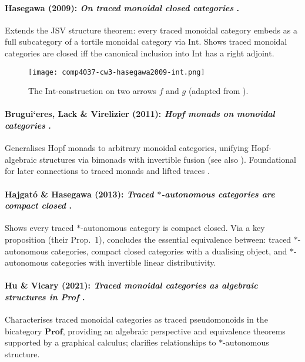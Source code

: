 \paragraph{Hasegawa (2009): \emph{On traced monoidal closed categories} \cite{hasegawa2009-traced-monoidal-closed}.}
Extends the JSV structure theorem: every traced monoidal category embeds as a full subcategory of a tortile monoidal category via $\mathrm{Int}$. Shows traced monoidal categories are closed iff the canonical inclusion into $\mathrm{Int}$ has a right adjoint.
\begin{figure}[ht]
	\centering
	\texttt{[image: comp4037-cw3-hasegawa2009-int.png]}
	\caption{The $\mathrm{Int}$-construction on two arrows $f$ and $g$ (adapted from \cite[Sec.\ 3.3]{hasegawa2009-traced-monoidal-closed}).}
	\label{fig:hasegawa-int}
\end{figure}
\paragraph{Brugui`eres, Lack \& Virelizier (2011): \emph{Hopf monads on monoidal categories} \cite{bruguieres2011-hopf-monads-monoidal}.}
Generalises Hopf monads to arbitrary monoidal categories, unifying Hopf-algebraic structures via bimonads with invertible fusion (see also \cite{day2004-quantum-categories-star,bohm2018-hopf-algebras-generalizations}). Foundational for later connections to traced monads and lifted traces \cite{shimizu2019-non-degeneracy-conditions-braided}.
\paragraph{Hajgat\'o \& Hasegawa (2013): \emph{Traced $*$-autonomous categories are compact closed} \cite{hajgato2013-traced-autonomous-categories}.}
Shows every traced $*$-autonomous category is compact closed. Via a key proposition (their Prop.\ 1), concludes the essential equivalence between: traced $*$-autonomous categories, compact closed categories with a dualising object, and $*$-autonomous categories with invertible linear distributivity.
\paragraph{Hu \& Vicary (2021): \emph{Traced monoidal categories as algebraic structures in Prof} \cite{hu2021-traced-monoidal-categories}.}
Characterises traced monoidal categories as traced pseudomonoids in the bicategory $\mathbf{Prof}$, providing an algebraic perspective and equivalence theorems supported by a graphical calculus; clarifies relationships to $*$-autonomous structure.
